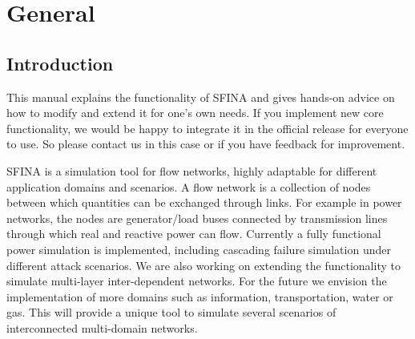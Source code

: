 \documentclass[11pt,fleqn]{book} %
\newcommand{\domain}[1][]{domain#1}
\begin{document}


\pagestyle{empty} %

\tableofcontents %

\clearpage %

\pagestyle{fancy} %


\part{General}



\chapter{Introduction}
\label{ch:introduction}
This manual explains the functionality of SFINA and gives hands-on advice on how to modify and extend it for one's own needs. If you implement new core functionality, we would be happy to integrate it in the official release for everyone to use. So please contact us in this case or if you have feedback for improvement.

SFINA is a simulation tool for flow networks, highly adaptable for different application \domain{s} and scenarios. A flow network is a collection of nodes between which quantities can be exchanged through links. For example in power networks, the nodes are generator/load buses connected by transmission lines through which real and reactive power can flow. Currently a fully functional power simulation is implemented, including cascading failure simulation under different attack scenarios. We are also working on extending the functionality to simulate multi-layer inter-dependent networks. For the future we envision the implementation of more \domain{s} such as information, transportation, water or gas. This will provide a unique tool to simulate several scenarios of interconnected multi-\domain{} networks.
\end{document}

